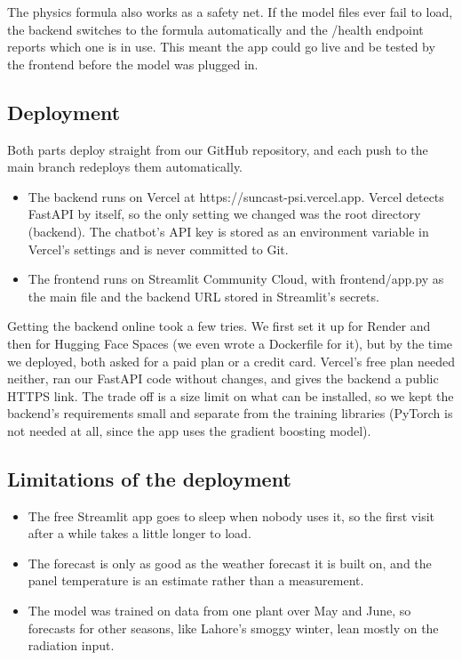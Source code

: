 The physics formula also works as a safety net. If the model files ever fail to load, the backend switches to the formula automatically and the /health endpoint reports which one is in use. This meant the app could go live and be tested by the frontend before the model was plugged in.

\subsection{Deployment}

Both parts deploy straight from our GitHub repository, and each push to the main branch redeploys them automatically.

\begin{itemize}
    \item The backend runs on Vercel at https://suncast-psi.vercel.app. Vercel detects FastAPI by itself, so the only setting we changed was the root directory (backend). The chatbot's API key is stored as an environment variable in Vercel's settings and is never committed to Git.
    \item The frontend runs on Streamlit Community Cloud, with frontend/app.py as the main file and the backend URL stored in Streamlit's secrets.
\end{itemize}

Getting the backend online took a few tries. We first set it up for Render and then for Hugging Face Spaces (we even wrote a Dockerfile for it), but by the time we deployed, both asked for a paid plan or a credit card. Vercel's free plan needed neither, ran our FastAPI code without changes, and gives the backend a public HTTPS link. The trade off is a size limit on what can be installed, so we kept the backend's requirements small and separate from the training libraries (PyTorch is not needed at all, since the app uses the gradient boosting model).

\subsection{Limitations of the deployment}

\begin{itemize}
    \item The free Streamlit app goes to sleep when nobody uses it, so the first visit after a while takes a little longer to load.
    \item The forecast is only as good as the weather forecast it is built on, and the panel temperature is an estimate rather than a measurement.
    \item The model was trained on data from one plant over May and June, so forecasts for other seasons, like Lahore's smoggy winter, lean mostly on the radiation input.
\end{itemize}